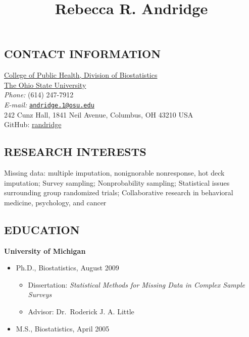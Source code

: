 \documentclass[
  english,
  letterpaper,
  DIV=11,
  numbers=noendperiod]{scrartcl}
\title{Rebecca R. Andridge}
\author{}
\date{}
\providecommand{\tightlist}{%
  \setlength{\itemsep}{0pt}\setlength{\parskip}{0pt}}
\begin{document}
\maketitle


\subsection*{CONTACT INFORMATION}\label{contact-information}

\href{https://cph.osu.edu/people/randridge}{College of Public Health,
Division of Biostatistics}\\
\href{http://www.osu.edu/}{The Ohio State University}\\
\emph{Phone:} (614) 247-7912\\
\emph{E-mail:}
\href{mailto:andridge.1@osu.edu}{\nolinkurl{andridge.1@osu.edu}}\\
242 Cunz Hall, 1841 Neil Avenue, Columbus, OH 43210 USA\\
GitHub: \href{https://github.com/randridge}{randridge}

\subsection{RESEARCH INTERESTS}\label{research-interests}

Missing data: multiple imputation, nonignorable nonresponse, hot deck
imputation; Survey sampling; Nonprobability sampling; Statistical issues
surrounding group randomized trials; Collaborative research in
behavioral medicine, psychology, and cancer

\subsection{EDUCATION}\label{education}

\textbf{University of Michigan}

\begin{itemize}
\tightlist
\item
  Ph.D., Biostatistics, August 2009

  \begin{itemize}
  \tightlist
  \item
    Dissertation: \emph{Statistical Methods for Missing Data in Complex
    Sample Surveys}
  \item
    Advisor: Dr.~Roderick J. A. Little
  \end{itemize}
\item
  M.S., Biostatistics, April 2005
\end{itemize}
\end{document}
